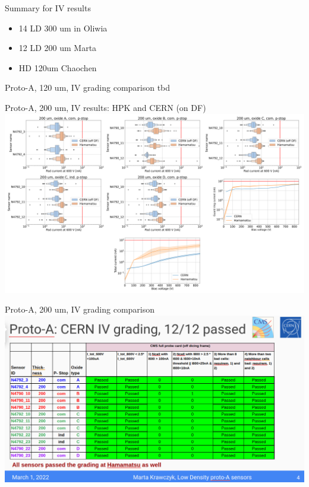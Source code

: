 \documentclass{beamer}
\begin{document}
\begin{frame}{Summary for IV results}
    \begin{itemize}
        \item 14 LD 300 um in Oliwia
        \item 12 LD 200 um Marta
        \item HD 120um  Chaochen
    \end{itemize}
    
\end{frame}

\begin{frame}{Proto-A, 120 um, IV grading comparison}
  tbd
\end{frame}

\begin{frame}{Proto-A, 200 um, IV results: HPK and CERN (on DF)}
  \includegraphics[width=.8\textwidth]{plots/IV_Comparison_SensorsHPK_200um.png}
\end{frame}

\begin{frame}{Proto-A, 200 um, IV grading comparison}
  \includegraphics[width=.8\textwidth]{plots/IV_CERN_HPK_200um.png}
\end{frame}
\end{document}
